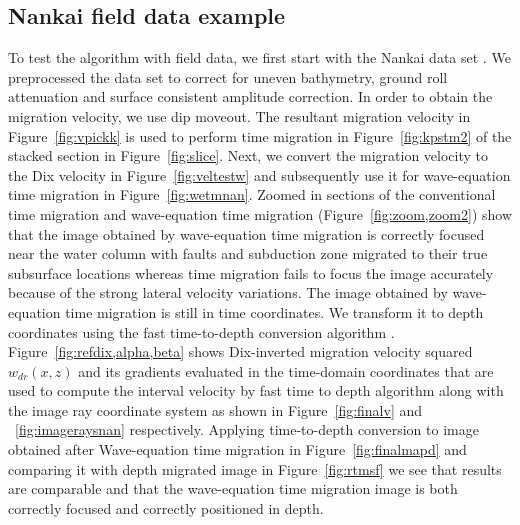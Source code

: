 \subsection{Nankai field data example}
To test the algorithm with field data, we first start with the Nankai data set \cite[]{forel2005seismic}. We preprocessed the data set to correct for uneven bathymetry, ground roll attenuation and surface consistent amplitude correction. In order to obtain the migration velocity, we use \cite{fowler1984velocity} dip moveout. The resultant migration velocity in Figure~\ref{fig:vpickk} is used to perform  time migration in Figure~\ref{fig:kpstm2} of the stacked section in Figure~\ref{fig:slice}. Next, we convert the migration velocity to the Dix velocity in Figure~\ref{fig:veltestw} and subsequently use it for wave-equation time migration in Figure~\ref{fig:wetmnan}. Zoomed in sections of the conventional time migration and wave-equation time migration (Figure~\ref{fig:zoom,zoom2}) show that the image obtained by wave-equation time migration is correctly focused near the water column with faults and subduction zone migrated to their true subsurface locations whereas time migration fails to focus the image accurately because of the strong lateral velocity variations. The image obtained by wave-equation time migration is still in time coordinates. We transform it to depth coordinates using the fast time-to-depth conversion algorithm \cite[]{sripanich2018fast}. Figure~\ref{fig:refdix,alpha,beta} shows Dix-inverted migration velocity squared $w_{dr}(x,z)$ and its gradients evaluated in the time-domain coordinates that are used to compute the interval velocity by fast time to depth algorithm along with the image ray coordinate system as shown in Figure~\ref{fig:finalv} and ~\ref{fig:imageraysnan} respectively. Applying time-to-depth conversion to image obtained after Wave-equation time migration in Figure~\ref{fig:finalmapd} and comparing it with depth migrated image in Figure~\ref{fig:rtmsf}  we see that results are comparable and that the wave-equation time migration image is both correctly focused and correctly positioned in depth.
